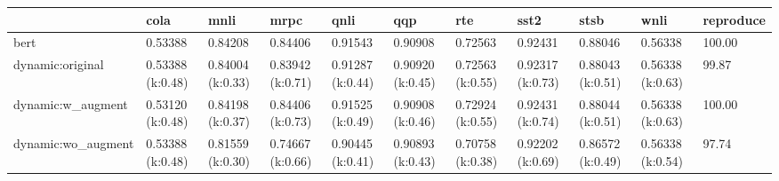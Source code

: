 \begin{tabular}{lllllllllll}
\toprule
{} &              cola &              mnli &              mrpc &              qnli &               qqp &               rte &              sst2 &              stsb &              wnli & reproduce \\
\midrule
bert               &           0.53388 &           0.84208 &           0.84406 &           0.91543 &           0.90908 &           0.72563 &           0.92431 &           0.88046 &           0.56338 &    100.00 \\
dynamic:original   &  0.53388 (k:0.48) &  0.84004 (k:0.33) &  0.83942 (k:0.71) &  0.91287 (k:0.44) &  0.90920 (k:0.45) &  0.72563 (k:0.55) &  0.92317 (k:0.73) &  0.88043 (k:0.51) &  0.56338 (k:0.63) &     99.87 \\
dynamic:w\_augment  &  0.53120 (k:0.48) &  0.84198 (k:0.37) &  0.84406 (k:0.73) &  0.91525 (k:0.49) &  0.90908 (k:0.46) &  0.72924 (k:0.55) &  0.92431 (k:0.74) &  0.88044 (k:0.51) &  0.56338 (k:0.63) &    100.00 \\
dynamic:wo\_augment &  0.53388 (k:0.48) &  0.81559 (k:0.30) &  0.74667 (k:0.66) &  0.90445 (k:0.41) &  0.90893 (k:0.43) &  0.70758 (k:0.38) &  0.92202 (k:0.69) &  0.86572 (k:0.49) &  0.56338 (k:0.54) &     97.74 \\
\bottomrule
\end{tabular}
